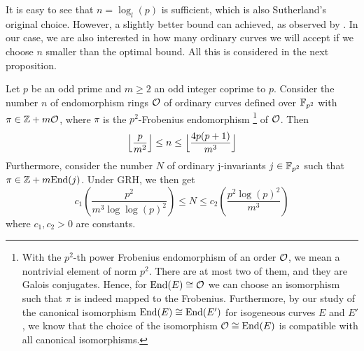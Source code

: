 It is easy to see that $n = \log_l(p)$ is sufficient, which is also Sutherland's original choice.
However, a slightly better bound can achieved, as observed by \cite{fp_supersingularity_tests}.
In our case, we are also interested in how many ordinary curves we will accept if we choose $n$ smaller than the optimal bound.
All this is considered in the next proposition.
\begin{theorem}
    \label{prop:counting_fp2_vulcano_levels}
    Let $p$ be an odd prime and $m \geq 2$ an odd integer coprime to $p$.
    Consider the number $n$ of endomorphism rings $\mathcal{O}$ of ordinary curves defined over $\mathbb{F}_{p^2}$ with $\pi \in \mathbb{Z} + m\mathcal{O}$, where $\pi$ is the $p^2$-Frobenius endomorphism
    \footnote{
        With the $p^2$-th power Frobenius endomorphism of an order $\mathcal{O}$, we mean a nontrivial element of norm $p^2$.
        There are at most two of them, and they are Galois conjugates. 
        Hence, for $\mathrm{End}(E) \cong \mathcal{O}$ we can choose an isomorphism such that $\pi$ is indeed mapped to the Frobenius. 
        Furthermore, by our study of the canonical isomorphism $\mathrm{End}(E) \cong \mathrm{End}(E')$ for isogeneous curves $E$ and $E'$, we know that the choice of the isomorphism $\mathcal{O} \cong \mathrm{End}(E)$ is compatible with all canonical isomorphisms.}
    of $\mathcal{O}$.
    Then
    \begin{equation*}
        \Bigl\lfloor \frac p {m^2} \Bigr\rfloor \leq n \leq \Bigl\lfloor \frac {4p(p + 1)} {m^3} \Bigr\rfloor
    \end{equation*}
    Furthermore, consider the number $N$ of ordinary j-invariants $j \in \mathbb{F}_{p^2}$ such that $\pi \in \mathbb{Z} + m\mathrm{End}(j)$.
    Under GRH, we then get
    \begin{equation*}
        c_1\left( \frac {p^2} {m^3 \log\log(p)^2} \right) \leq N \leq c_2\left( \frac {p^2\log(p)^2} {m^3} \right)
    \end{equation*}
    where $c_1, c_2 > 0$ are constants.
\end{theorem}
